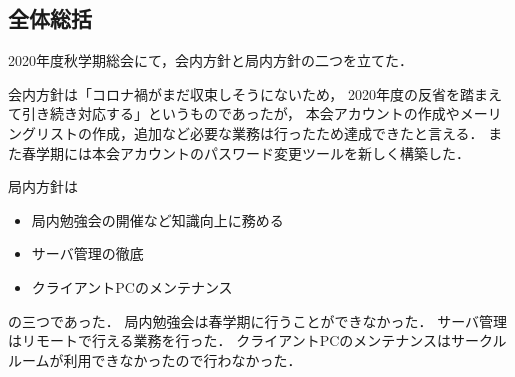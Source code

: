 \subsection*{全体総括}


2020年度秋学期総会にて，会内方針と局内方針の二つを立てた．

会内方針は「コロナ禍がまだ収束しそうにないため，
2020年度の反省を踏まえて引き続き対応する」というものであったが，
本会アカウントの作成やメーリングリストの作成，追加など必要な業務は行ったため達成できたと言える．
また春学期には本会アカウントのパスワード変更ツールを新しく構築した．

局内方針は
\begin{itemize}
  \item 局内勉強会の開催など知識向上に務める
  \item サーバ管理の徹底
  \item クライアントPCのメンテナンス
\end{itemize}
の三つであった．
局内勉強会は春学期に行うことができなかった．
サーバ管理はリモートで行える業務を行った．
クライアントPCのメンテナンスはサークルルームが利用できなかったので行わなかった．
